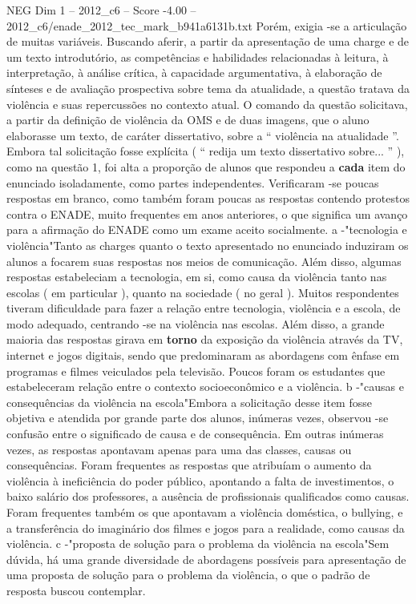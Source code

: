 \begin{textsample}{NEG Dim 1 – 2012\_c6 – Score -4.00 – 2012\_c6/enade\_2012\_tec\_mark\_b941a6131b.txt}
Porém, exigia -se a articulação de muitas variáveis.
Buscando aferir, a partir da apresentação de uma charge e de um texto introdutório, as competências e habilidades relacionadas à leitura, à interpretação, à análise crítica, à capacidade argumentativa, à elaboração de sínteses e de avaliação prospectiva sobre tema da atualidade, a questão tratava da violência e suas repercussões no contexto atual.
O comando da questão solicitava, a partir da definição de violência da OMS e de duas imagens, que o aluno elaborasse um texto, de caráter dissertativo, sobre a “ violência na atualidade ”.
Embora tal solicitação fosse explícita ( “ redija um texto dissertativo sobre... ” ), como na questão 1, foi alta a proporção de alunos que respondeu a \textbf{cada} item do enunciado isoladamente, como partes independentes.
Verificaram -se poucas respostas em branco, como também foram poucas as respostas contendo protestos contra o ENADE, muito frequentes em anos anteriores, o que significa um avanço para a afirmação do ENADE como um exame aceito socialmente. a -"tecnologia e violência"Tanto as charges quanto o texto apresentado no enunciado induziram os alunos a focarem suas respostas nos meios de comunicação.
Além disso, algumas respostas estabeleciam a tecnologia, em si, como causa da violência tanto nas escolas ( em particular ), quanto na sociedade ( no geral ).
Muitos respondentes tiveram dificuldade para fazer a relação entre tecnologia, violência e a escola, de modo adequado, centrando -se na violência nas escolas.
Além disso, a grande maioria das respostas girava em \textbf{torno} da exposição da violência através da TV, internet e jogos digitais, sendo que predominaram as abordagens com ênfase em programas e filmes veiculados pela televisão.
Poucos foram os estudantes que estabeleceram relação entre o contexto socioeconômico e a violência. b -"causas e consequências da violência na escola"Embora a solicitação desse item fosse objetiva e atendida por grande parte dos alunos, inúmeras vezes, observou -se confusão entre o significado de causa e de consequência.
Em outras inúmeras vezes, as respostas apontavam apenas para uma das classes, causas ou consequências.
Foram frequentes as respostas que atribuíam o aumento da violência à ineficiência do poder público, apontando a falta de investimentos, o baixo salário dos professores, a ausência de profissionais qualificados como causas.
Foram frequentes também os que apontavam a violência doméstica, o bullying, e a transferência do imaginário dos filmes e jogos para a realidade, como causas da violência. c -"proposta de solução para o problema da violência na escola"Sem dúvida, há uma grande diversidade de abordagens possíveis para apresentação de uma proposta de solução para o problema da violência, o que o padrão de resposta buscou contemplar.

\end{textsample}

